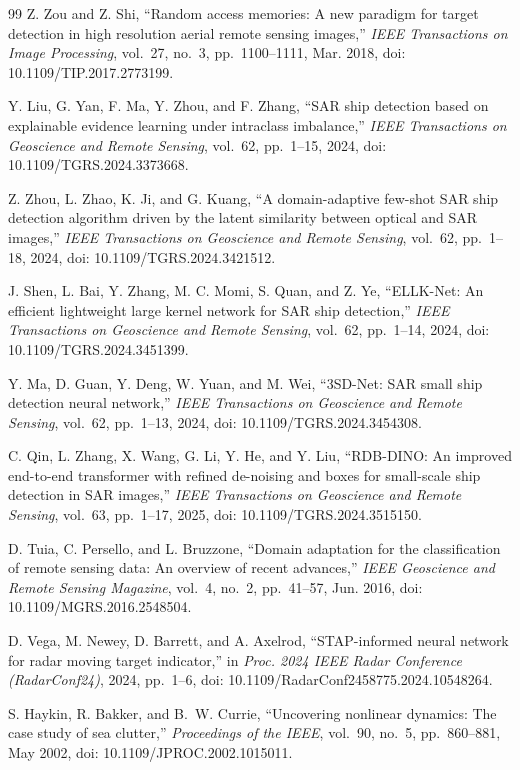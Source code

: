 \documentclass[journal]{IEEEtran}
\begin{document}
\begin{thebibliography}{99}
Z. Zou and Z. Shi, ``Random access memories: A new paradigm for target detection in high resolution aerial remote sensing images,'' \emph{IEEE Transactions on Image Processing}, vol.~27, no.~3, pp.~1100--1111, Mar. 2018, doi: 10.1109/TIP.2017.2773199.

Y. Liu, G. Yan, F. Ma, Y. Zhou, and F. Zhang, ``SAR ship detection based on explainable evidence learning under intraclass imbalance,'' \emph{IEEE Transactions on Geoscience and Remote Sensing}, vol.~62, pp.~1--15, 2024, doi: 10.1109/TGRS.2024.3373668.

Z. Zhou, L. Zhao, K. Ji, and G. Kuang, ``A domain-adaptive few-shot SAR ship detection algorithm driven by the latent similarity between optical and SAR images,'' \emph{IEEE Transactions on Geoscience and Remote Sensing}, vol.~62, pp.~1--18, 2024, doi: 10.1109/TGRS.2024.3421512.

J. Shen, L. Bai, Y. Zhang, M. C. Momi, S. Quan, and Z. Ye, ``ELLK-Net: An efficient lightweight large kernel network for SAR ship detection,'' \emph{IEEE Transactions on Geoscience and Remote Sensing}, vol.~62, pp.~1--14, 2024, doi: 10.1109/TGRS.2024.3451399.

Y. Ma, D. Guan, Y. Deng, W. Yuan, and M. Wei, ``3SD-Net: SAR small ship detection neural network,'' \emph{IEEE Transactions on Geoscience and Remote Sensing}, vol.~62, pp.~1--13, 2024, doi: 10.1109/TGRS.2024.3454308.

C. Qin, L. Zhang, X. Wang, G. Li, Y. He, and Y. Liu, ``RDB-DINO: An improved end-to-end transformer with refined de-noising and boxes for small-scale ship detection in SAR images,'' \emph{IEEE Transactions on Geoscience and Remote Sensing}, vol.~63, pp.~1--17, 2025, doi: 10.1109/TGRS.2024.3515150.

D. Tuia, C. Persello, and L. Bruzzone, ``Domain adaptation for the classification of remote sensing data: An overview of recent advances,'' \emph{IEEE Geoscience and Remote Sensing Magazine}, vol.~4, no.~2, pp.~41--57, Jun. 2016, doi: 10.1109/MGRS.2016.2548504.

D. Vega, M. Newey, D. Barrett, and A. Axelrod, ``STAP-informed neural network for radar moving target indicator,'' in \emph{Proc. 2024 IEEE Radar Conference (RadarConf24)}, 2024, pp.~1--6, doi: 10.1109/RadarConf2458775.2024.10548264.

S. Haykin, R. Bakker, and B.~W. Currie, ``Uncovering nonlinear dynamics: The case study of sea clutter,'' \emph{Proceedings of the IEEE}, vol.~90, no.~5, pp.~860--881, May 2002, doi: 10.1109/JPROC.2002.1015011.


\end{thebibliography}
\end{document}
